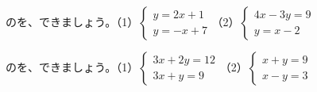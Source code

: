 \begingroup{}%
\noindent\begin{minipage}[t]{0.49\linewidth}
\begin{jibun}\raggedright
{}のを、できましょう。（1）\nobreak $\begin{cases} y=2x+1\\ y=-x+7 \end{cases}$\quad（2）\nobreak $\begin{cases} 4x-3y=9\\ y=x-2 \end{cases}$
\end{jibun}
\end{minipage}\hfill
\begin{minipage}[t]{0.49\linewidth}
\begin{jibun}\raggedright
{}のを、できましょう。（1）\nobreak $\begin{cases} 3x+2y=12\\ 3x+y=9 \end{cases}$\quad（2）\nobreak $\begin{cases} x+y=9\\ x-y=3 \end{cases}$
\end{jibun}
\end{minipage}\par
\endgroup

